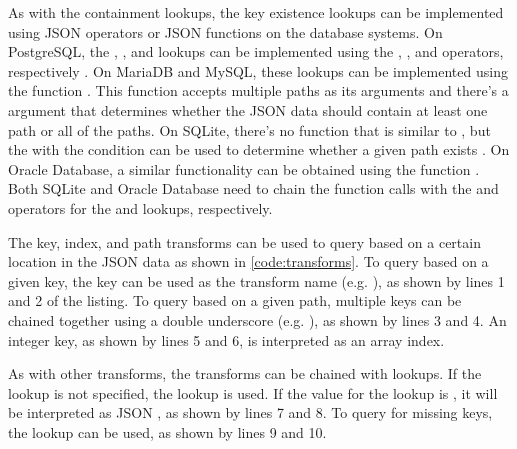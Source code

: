 As with the containment lookups, the key existence lookups can be implemented
using JSON operators or JSON functions on the database systems. On PostgreSQL,
the , , and  lookups can be
implemented using the , , and  operators,
respectively \cite{postgres:json_operators}. On MariaDB and MySQL, these
lookups can be implemented using the  function
\cite{mariadb:json_contains_path, mysql:json_search}. This function accepts
multiple paths as its arguments and there's a  argument that
determines whether the JSON data should contain at least one path or all of the
paths. On SQLite, there's no function that is similar to
, but the  with the  condition can be used to determine whether a given path exists
\cite{sqlite:json1}. On Oracle Database, a similar functionality can be
obtained using the  function \cite{oracle:json_exists}. Both
SQLite and Oracle Database need to chain the function calls with the 
and  operators for the  and 
lookups, respectively.

\noindent
\begin{minipage}{\linewidth}

\end{minipage}

The key, index, and path transforms can be used to query based on a certain
location in the JSON data as shown in \autoref{code:transforms}. To query based
on a given key, the key can be used as the transform name (e.g.
), as shown by lines 1 and 2 of the listing. To query based
on a given path, multiple keys can be chained together using a double
underscore (e.g. ), as shown by lines 3 and 4. An
integer key, as shown by lines 5 and 6, is interpreted as an array index.

As with other transforms, the  transforms can be chained with
lookups. If the lookup is not specified, the  lookup is used. If
the value for the  lookup is , it will be interpreted as
JSON , as shown by lines 7 and 8. To query for missing keys, the
 lookup can be used, as shown by lines 9 and 10.

